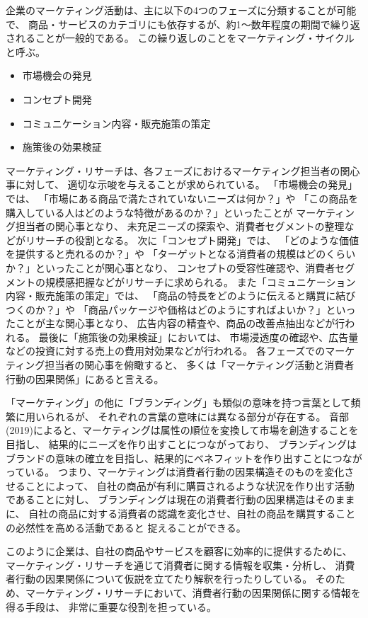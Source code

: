 企業のマーケティング活動は、主に以下の4つのフェーズに分類することが可能で、
商品・サービスのカテゴリにも依存するが、約1〜数年程度の期間で繰り返されることが一般的である。
この繰り返しのことをマーケティング・サイクルと呼ぶ。
\begin{itemize}
  \item 市場機会の発見
  \item コンセプト開発
  \item コミュニケーション内容・販売施策の策定
  \item 施策後の効果検証
\end{itemize}
マーケティング・リサーチは、各フェーズにおけるマーケティング担当者の関心事に対して、
適切な示唆を与えることが求められている。
「市場機会の発見」では、
「市場にある商品で満たされていないニーズは何か？」や
「この商品を購入している人はどのような特徴があるのか？」といったことが
マーケティング担当者の関心事となり、
未充足ニーズの探索や、消費者セグメントの整理などがリサーチの役割となる。
次に「コンセプト開発」では、
「どのような価値を提供すると売れるのか？」や
「ターゲットとなる消費者の規模はどのくらいか？」といったことが関心事となり、
コンセプトの受容性確認や、消費者セグメントの規模感把握などがリサーチに求められる。
また「コミュニケーション内容・販売施策の策定」では、
「商品の特長をどのように伝えると購買に結びつくのか？」や
「商品パッケージや価格はどのようにすればよいか？」といったことが主な関心事となり、
広告内容の精査や、商品の改善点抽出などが行われる。
最後に「施策後の効果検証」においては、
市場浸透度の確認や、広告量などの投資に対する売上の費用対効果などが行われる。
各フェーズでのマーケティング担当者の関心事を俯瞰すると、
多くは「マーケティング活動と消費者行動の因果関係」にあると言える。

「マーケティング」の他に「ブランディング」も類似の意味を持つ言葉として頻繁に用いられるが、
それぞれの言葉の意味には異なる部分が存在する。
音部(2019)\cite{2019-eb}によると、マーケティングは属性の順位を変換して市場を創造することを目指し、
結果的にニーズを作り出すことにつながっており、
ブランディングはブランドの意味の確立を目指し、結果的にベネフィットを作り出すことにつながっている。
つまり、マーケティングは消費者行動の因果構造そのものを変化させることによって、
自社の商品が有利に購買されるような状況を作り出す活動であることに対し、
ブランディングは現在の消費者行動の因果構造はそのままに、
自社の商品に対する消費者の認識を変化させ、自社の商品を購買することの必然性を高める活動であると
捉えることができる。

このように企業は、自社の商品やサービスを顧客に効率的に提供するために、
マーケティング・リサーチを通じて消費者に関する情報を収集・分析し、
消費者行動の因果関係について仮説を立てたり解釈を行ったりしている。
そのため、マーケティング・リサーチにおいて、消費者行動の因果関係に関する情報を得る手段は、
非常に重要な役割を担っている。
